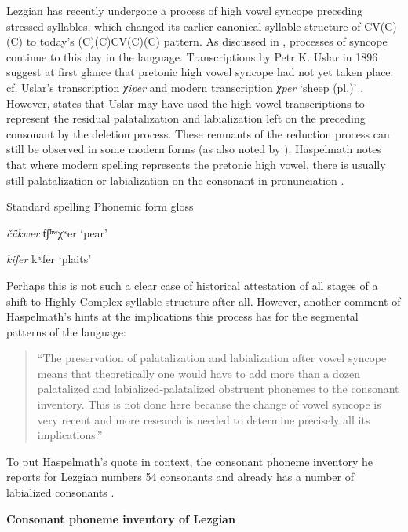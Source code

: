   Lezgian has recently undergone a process of high vowel syncope preceding stressed syllables, which changed its earlier canonical syllable structure of CV(C)(C) to today’s (C)(C)CV(C)(C) pattern. As discussed in , processes of syncope continue to this day in the language. Transcriptions by Petr K. Uslar in 1896 suggest at first glance that pretonic high vowel syncope had not yet taken place: cf. Uslar’s transcription \textit{χiper} and modern transcription \textit{χper} ‘sheep (pl.)’ \citep[36]{Haspelmath1993}. However, \citet[56]{Haspelmath1993} states that Uslar may have used the high vowel transcriptions to represent the residual palatalization and labialization left on the preceding consonant by the deletion process. These remnants of the reduction process can still be observed in some modern forms (as also noted by \citealt{ChitoranBabaliyeva2007}). Haspelmath notes that where modern spelling represents the pretonic high vowel, there is usually still palatalization or labialization on the consonant in pronunciation .

\ea\label{ex:8.3}

Standard spelling  Phonemic form  gloss

\textit{čükwer}      t͡ʃʰʷχʷer    ‘pear’

\textit{kifer}      kʰʲfer       ‘plaits’
\citep[37]{Haspelmath1993}
\z

Perhaps this is not such a clear case of historical attestation of all stages of a shift to Highly Complex syllable structure after all. However, another comment of Haspelmath’s hints at the implications this process has for the segmental patterns of the language:

\begin{quote}
“The preservation of palatalization and labialization after vowel syncope means that theoretically one would have to add more than a dozen palatalized and labialized-palatalized obstruent phonemes to the consonant inventory. This is not done here because the change of vowel syncope is very recent and more research is needed to determine precisely all its implications.”
\citep[38]{Haspelmath1993}
\end{quote}

To put Haspelmath’s quote in context, the consonant phoneme inventory he reports for Lezgian numbers 54 consonants and already has a number of labialized consonants .

\ea\label{ex:8.4}
  \textbf{Consonant phoneme inventory of Lezgian}

